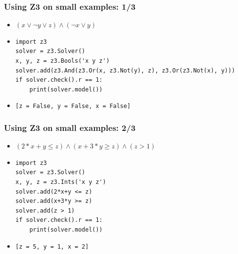 \documentclass[aspectratio=169]{beamer}
\begin{document}
\begin{frame}[fragile]
\frametitle{Using Z3 on small examples: 1/3}
\begin{itemize}
\item $(x \lor \neg y \lor z) \land (\neg x \lor y)$
\item \begin{Verbatim}[fontsize=\scriptsize, frame=single]
import z3
solver = z3.Solver()
x, y, z = z3.Bools('x y z')
solver.add(z3.And(z3.Or(x, z3.Not(y), z), z3.Or(z3.Not(x), y)))
if solver.check().r == 1:
    print(solver.model())
\end{Verbatim}
\item \begin{Verbatim}[fontsize=\scriptsize, frame=single]
[z = False, y = False, x = False]
\end{Verbatim}
\end{itemize}
\end{frame}

\begin{frame}[fragile]
\frametitle{Using Z3 on small examples: 2/3}
\begin{itemize}
\item $(2*x+y \le z) \land (x+3*y \ge z) \land (z > 1)$
\item \begin{Verbatim}[fontsize=\scriptsize, frame=single]
import z3
solver = z3.Solver()
x, y, z = z3.Ints('x y z')
solver.add(2*x+y <= z)
solver.add(x+3*y >= z)
solver.add(z > 1)
if solver.check().r == 1:
    print(solver.model())
\end{Verbatim}
\item \begin{Verbatim}[fontsize=\scriptsize, frame=single]
[z = 5, y = 1, x = 2]
\end{Verbatim}
\end{itemize}
\end{frame}
\end{document}
